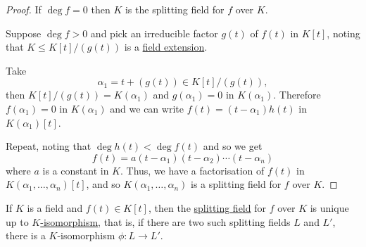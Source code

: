 \documentclass{article}
\begin{document}
\begin{proof}
    If $\deg f = 0$ then $K$ is the splitting field for $f$ over $K$.

    Suppose $\deg f > 0$ and pick an irreducible factor $g(t)$ of $f(t)$ in $K[t]$, noting that $K \leq K[t] / (g(t))$ is a \hyperlink{def:fieldExt}{field extension}.

    Take
    \begin{equation*}\alpha_1 = t + (g(t)) \in K[t]/(g(t)),\end{equation*}
    then $K[t]/(g(t)) = K(\alpha_1)$ and $g(\alpha_1) = 0$ in $K(\alpha_1)$.
    Therefore $f(\alpha_1) = 0$ in $K(\alpha_1)$ and we can write $f(t) = (t-\alpha_1) h(t)$ in $K(\alpha_1)[t]$.

    Repeat, noting that $\deg h(t) < \deg f(t)$ and so we get
    \begin{equation*}f(t) = a(t - \alpha_1)(t - \alpha_2) \dotsm (t-\alpha_n)\end{equation*}
    where $a$ is a constant in $K$.
    Thus, we have a factorisation of $f(t)$ in $K(\alpha_1, \dotsc, \alpha_n)[t]$, and so $K(\alpha_1, \dotsc, \alpha_n)$ is a splitting field for $f$ over $K$.
\end{proof}

\begin{nthm}\label{thm:1.24}
    If $K$ is a field and $f(t) \in K[t]$, then the \hyperlink{def:splitting}{splitting field} for $f$ over $K$ is unique up to \hyperlink{def:homo}{$K$-isomorphism}, that is, if there are two such splitting fields $L$ and $L'$, there is a $K$-isomorphism $\phi: L \to L'$.
\end{nthm}

\end{document}
